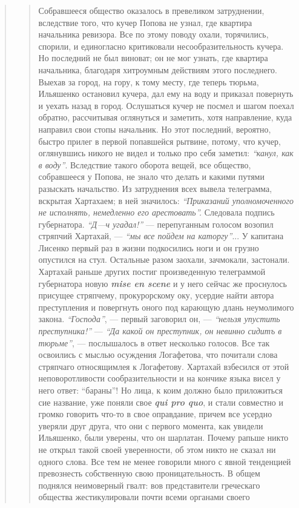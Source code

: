 \begin{quote}
\begin{quote}
Собравшееся общество оказалось в превеликом затруднении, вследствие того, 
что кучер Попова не узнал, где квартира начальника ревизора. Все по этому поводу охали,
торячились, спорили, и единогласно критиковали несообразительность кучера. 
Но последний не был виноват; он не мог
узнать, где квартира начальника, благодаря хитроумным действиям этого последнего. Выехав за город, на
гору, к тому месту, где теперь тюрьма, Ильяшенко остановил кучера, 
дал ему на воду и приказал повернуть
и уехать назад в город. Ослушаться кучер не посмел
и шагом поехал обратно, рассчитывая оглянуться и заметить,
хотя направление, куда направил свои стопы начальник. 
Но этот последний, вероятно, быстро прилег в
первой попавшейся рытвине, потому, что кучер, оглянувшись
никого не видел и только про себя заметил:
\emph{``канул, как в воду''}. Вследствие такого оборота вещей, все общество, 
собравшееся у Попова, не знало что делать и какими
путями разыскать начальство. Из затруднения всех вывела телеграмма, вскрытая Хартахаем;
в ней значилось: 
\emph{``Приказаний уполномоченного не исполнять, немедленно его арестовать''.}
Следовала подпись губернатора. \emph{``Д—ч угадал!''} —
перепуганным голосом возопил стряпчий Хартахай, — \emph{``мы
все пойдем на каторгу''}... У капитана Лисенко первый
раз в жизни подкосились ноги и он грузно опустился
на стул. Остальные разом заохали, зачмокали, застонали.
Хартахай раньше других постиг произведенную телеграммой губернатора новую \textbf{\em mise en scene} 
и у него сейчас же проснулось присущее стряпчему, прокурорскому оку,
усердие найти автора преступления и повергнуть оного под
карающую длань неумолимого закона. \emph{``Господа''}, — первый
заговорил он, — \emph{``нельзя упустить преступника!''} — \emph{``Да какой он преступник, он невинно сидитъ в тюрьме''}, —
послышалось в ответ несколько голосов. Все так освоились с мыслью осуждения Логафетова, что почитали слова
стряпчаго относящимлея к Логафетову. Хартахай взбесился от этой
неповоротливости сообразительности и на кончике языка висел у него ответ:
``бараны''! Но лица, к коим должно было приложиться сие название, уже поняли
свое \textbf{\em qui pro quo}, и стали совместно и громко говорить что-то в
свое оправдание, причем все усердно уверяли друг друга, что они с первого
момента, как увидели Ильяшенко, были уверены, что он шарлатан.  Почему рапьше
никто не открыл такой своей уверенности, об этом никто не сказал ни одного
слова.  Все тем не менее говорили много с явной тенденцией превознесть
собственную свою проницательность.  В общем поднялся неимоверный гвалт: вов
представители греческаго общества жестикулировали почти всеми органами своего

\end{quote}
\end{quote}
